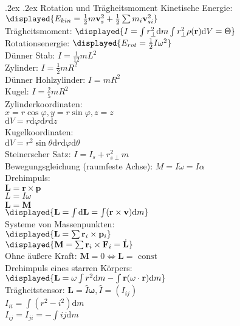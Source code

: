 \documentclass[10pt,landscape,a4paper]{article}
\makeatletter
\renewcommand{\subsection}{\@startsection{subsection}{1}{0mm}%
                                {.2ex}%
                                {.2ex}%
                                {\sffamily\bfseries}}
\renewcommand{\vec}[1]{\mathbf{#1}}
\renewcommand{\phi}{\varphi}
\newcommand\const{\text{ const }}
\renewcommand\d{\mathrm{d}}
\renewcommand\v[1]{\vec{#1}}
\makeatother
\begin{document}
\begin{multicols*}{4}
  \subsection{Rotation und Trägheitsmoment}
  Kinetische Energie: \\
  $\displayed{E_{kin} = \frac{1}{2} m \v v_s^2 + \frac{1}{2}\sum m_i \v v_{si}^2}$ \\
  Trägheitsmoment: $\displayed{I = \int r_{\perp}^2 \d m \int r_{\perp}^2 \rho(\v r) \d V = \Theta}$ \\
  Rotationsenergie: $\displayed{E_{rot} = \frac{1}{2}I\omega^2}$ \\
  Dünner Stab: $I = \frac{1}{12} m L^2$ \\
  Zylinder: $I = \frac{1}{2}m R^2$ \\
  Dünner Hohlzylinder: $I = m R^2$ \\
  Kugel: $I = \frac{2}{5} m R^2$ \\
  Zylinderkoordinaten: \\
  $x = r\cos \phi, y = r\sin \phi, z = z$ \\
  $\d V = r\d \phi\d r\d z$ \\
  Kugelkoordinaten: \\
  $\d V = r^2 \sin\theta \d r \d\phi \d \theta$ \\
  Steinerscher Satz: $I = I_s + r^2_{s\perp} m$ \\
  Bewegungsgleichung (raumfeste Achse): $M = I \dot{\omega} = I\alpha$ \\
  Drehimpuls: \\
  $\v L = \v r\times \v p$ \\
  $L = I\omega$ \\
  $\dot{\v L} = \v M$ \\
  $\displayed{\v L = \int \d \v L = \int (\v r\times \v v)\d m}$ \\
  Systeme von Massenpunkten:\\
  $\displayed{\v L = \sum \v r_i \times \v p_i}$ \\
  $\displayed{\v M = \sum \v r_i \times \v F_i = \dot{\v L}}$ \\
  Ohne äußere Kraft: $\v M = 0 \iff \v L = \const$ \\
  Drehimpuls eines starren Körpers: \\
  $\displayed{\v L = \v \omega \int r^2 \d m - \int \v r(\v\omega \cdot \v r)\d m}$ \\
  Trägheitstensor: $\v L = \hat I \v \omega, \hat I = (I_{ij})$ \\
  $I_{ii} = \int (r^2 - i^2)\d m$ \\
  $I_{ij} = I_{ji} = -\int ij \d m$

\end{multicols*}
\end{document}
